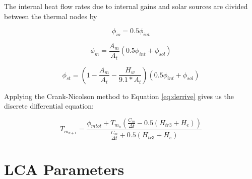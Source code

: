 The internal heat flow rates due to internal gains and solar sources are divided between the thermal nodes by

\begin{equation} 
\label{eq:phi_ia2}
      \phi_{io}= 0.5\phi_{int}
\end{equation}

\begin{equation} 
\label{eq:phi_m2}
      \phi_{m}= \frac{A_m}{A_t}(0.5\phi_{int} + \phi_{sol})
\end{equation}

\begin{equation} 
\label{eq:phi_st2}
      \phi_{st}= (1-\frac{A_m}{A_t}-\frac{H_w}{9.1*A_t})(0.5\phi_{int}+\phi_{sol})
\end{equation}




Applying the Crank-Nicolson method \cite{crank1947practical} to Equation \ref{eq:derrive} gives us the discrete differential equation: 

\begin{equation} 
\label{eq:derivation2}
      T_{m_{k+1}}={\frac{\phi_{mtot}+T_{m_k}(\frac{C_m}{\Delta t} - 0.5(H_{tr3}+H_e))}{\frac{C_m}{\Delta t} + 0.5(H_{tr3}+H_e)}}
\end{equation}



\section{LCA Parameters}
